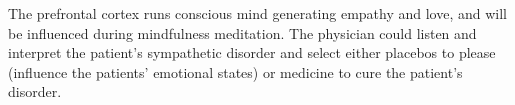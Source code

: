 \documentclass[12pt, a4paper]{article}
\begin{document}
The prefrontal cortex runs conscious mind generating empathy and love, and will be influenced during mindfulness meditation\citep{Krummenacher2010}\citep{Bennett2018}.
The physician could listen and interpret the patient's sympathetic disorder and select either placebos to please (influence the patients' emotional states) or medicine to cure the patient's disorder.
\end{document}
